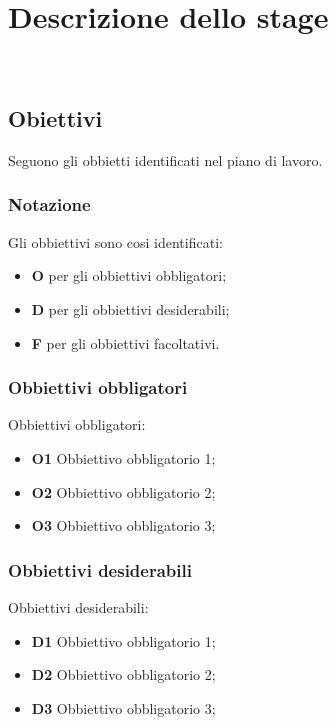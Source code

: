 \chapter{Descrizione dello stage}
\\
\label{cap:descrizione-stage}
\section{Obiettivi}
\label{sec:obiettivi}
Seguono gli obbietti identificati nel piano di lavoro.\\

\subsection{Notazione}
\label{subsec:notazione}
Gli obbiettivi sono cosi identificati:

\begin{itemize}
    \item \textbf{O} per gli obbiettivi obbligatori;
    \item \textbf{D} per gli obbiettivi desiderabili;
    \item \textbf{F} per gli obbiettivi facoltativi.
\end{itemize}

\subsection{Obbiettivi obbligatori}
Obbiettivi obbligatori:

\begin{itemize}
    \item \textbf{O1} Obbiettivo obbligatorio 1;
    \item \textbf{O2} Obbiettivo obbligatorio 2;
    \item \textbf{O3} Obbiettivo obbligatorio 3;

\end{itemize}
\subsection{Obbiettivi desiderabili}
Obbiettivi desiderabili:
\begin{itemize}
    \item \textbf{D1} Obbiettivo obbligatorio 1;
    \item \textbf{D2} Obbiettivo obbligatorio 2;
    \item \textbf{D3} Obbiettivo obbligatorio 3;

\end{itemize}
